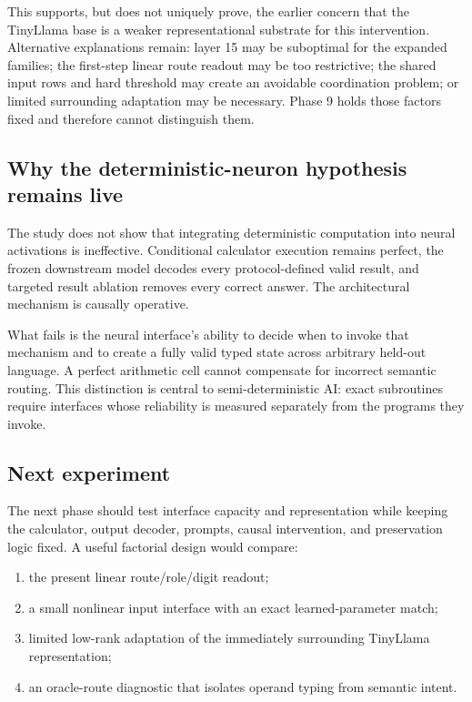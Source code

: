 \documentclass[11pt]{article}
\begin{document}
This supports, but does not uniquely prove, the earlier concern that the
TinyLlama base is a weaker representational substrate for this intervention.
Alternative explanations remain: layer 15 may be suboptimal for the expanded
families; the first-step linear route readout may be too restrictive; the
shared input rows and hard threshold may create an avoidable coordination
problem; or limited surrounding adaptation may be necessary. Phase 9 holds
those factors fixed and therefore cannot distinguish them.

\subsection{Why the deterministic-neuron hypothesis remains live}

The study does not show that integrating deterministic computation into neural
activations is ineffective. Conditional calculator execution remains perfect,
the frozen downstream model decodes every protocol-defined valid result, and
targeted result ablation removes every correct answer. The architectural
mechanism is causally operative.

What fails is the neural interface's ability to decide when to invoke that
mechanism and to create a fully valid typed state across arbitrary held-out
language. A perfect arithmetic cell cannot compensate for incorrect semantic
routing. This distinction is central to semi-deterministic AI: exact
subroutines require interfaces whose reliability is measured separately from
the programs they invoke.

\subsection{Next experiment}

The next phase should test interface capacity and representation while keeping
the calculator, output decoder, prompts, causal intervention, and preservation
logic fixed. A useful factorial design would compare:

\begin{enumerate}
\item the present linear route/role/digit readout;
\item a small nonlinear input interface with an exact learned-parameter match;
\item limited low-rank adaptation of the immediately surrounding TinyLlama
      representation;
\item an oracle-route diagnostic that isolates operand typing from semantic
      intent.
\end{enumerate}
\end{document}

